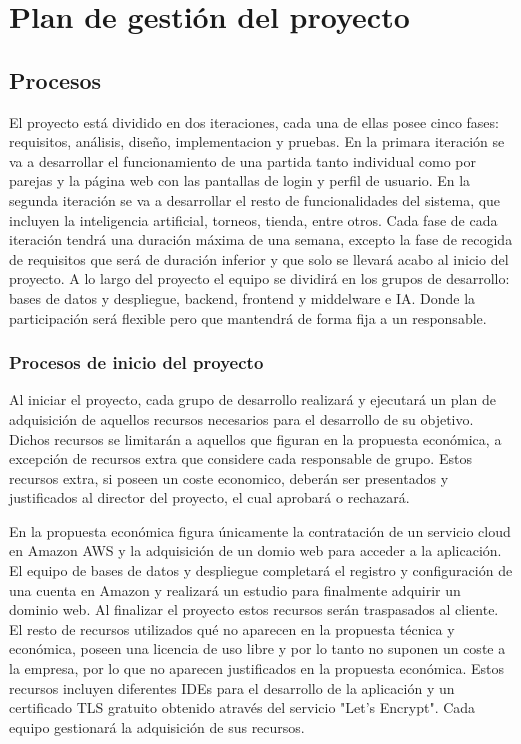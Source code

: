 \section{Plan de gestión del proyecto}
\label{planes}
\subsection{Procesos}
\label{procesos}

El proyecto está dividido en dos iteraciones, cada una de ellas posee cinco fases: requisitos, análisis, diseño, implementacion y pruebas. En la primara iteración se va a desarrollar el funcionamiento de una partida tanto individual como por parejas y la página web con las pantallas de login y perfil de usuario. En la segunda iteración se va a desarrollar el resto de funcionalidades del sistema, que incluyen la inteligencia artificial, torneos, tienda, entre otros.  Cada fase de cada iteración tendrá una duración máxima de una semana, excepto la fase de recogida de requisitos que será de duración inferior y que solo se llevará acabo al inicio del proyecto.
A lo largo del proyecto el equipo se dividirá en los grupos de desarrollo: bases de datos y despliegue, backend, frontend y middelware e IA. Donde la participación será flexible pero que mantendrá de forma fija a un responsable.

\subsubsection{Procesos de inicio del proyecto}

Al iniciar el proyecto, cada grupo de desarrollo realizará y ejecutará un plan de adquisición de aquellos recursos necesarios para el desarrollo de su objetivo. Dichos recursos se limitarán a aquellos que figuran en la propuesta económica, a excepción de recursos extra que considere cada responsable de grupo. Estos recursos extra, si poseen un coste economico, deberán ser presentados y justificados al director del proyecto, el cual aprobará o rechazará.

En la propuesta económica figura únicamente la contratación de un servicio cloud en Amazon AWS y la adquisición de un domio web para acceder a la aplicación. El equipo de bases de datos y despliegue completará el registro y configuración de una cuenta en Amazon y realizará un estudio para finalmente adquirir un dominio web. Al finalizar el proyecto estos recursos serán traspasados al cliente. El resto de recursos utilizados qué no aparecen en la propuesta técnica y económica, poseen una licencia de uso libre y por lo tanto no suponen un coste a la empresa, por lo que no aparecen justificados en la propuesta económica. Estos recursos incluyen diferentes IDEs para el desarrollo de la aplicación y un certificado TLS gratuito obtenido através del servicio "Let's Encrypt". Cada equipo gestionará la adquisición de sus recursos.

